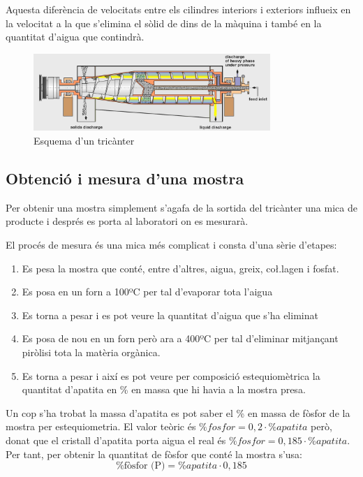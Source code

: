 \documentclass[a4paper]{article}
\begin{document}
Aquesta diferència de velocitats entre els cilindres interiors i exteriors influeix en la velocitat a la que s'elimina el sòlid de dins de la màquina i també en la quantitat d'aigua que contindrà.

\begin{figure}[H]
	\centering
	\includegraphics[width=0.8\textwidth]{images/tricanter}
	\caption{Esquema d'un tricànter}
	\label{fig:tricanter}
\end{figure}

\subsection{Obtenció i mesura d'una mostra}
Per obtenir una mostra simplement s'agafa de la sortida del tricànter una mica de producte i després es porta al laboratori on es mesurarà.

El procés de mesura és una mica més complicat i consta d'una sèrie d'etapes:

\begin{enumerate}
	\item Es pesa la mostra que conté, entre d'altres, aigua, greix, co\l.lagen i fosfat.
	\item Es posa en un forn a 100ºC per tal d'evaporar tota l'aigua 
	\item Es torna a pesar i es pot veure la quantitat d'aigua que s'ha eliminat
	\item Es posa de nou en un forn però ara a 400ºC per tal d'eliminar mitjançant piròlisi tota la matèria orgànica.
	\item Es torna a pesar i així es pot veure per composició estequiomètrica la quantitat d'apatita en \% en massa que hi havia a la mostra presa.
\end{enumerate} 

Un cop s'ha trobat la massa d'apatita es pot saber el \% en massa de fòsfor de la mostra per estequiometria. El valor teòric és $\% fosfor = 0,2 \cdot \% apatita$ però, donat que el cristall d'apatita porta aigua el real és $\% fosfor = 0,185 \cdot \% apatita$. Per tant, per obtenir la quantitat de fòsfor que conté la mostra s'usa:
$$
\boxed{\% \text{fòsfor (P)} = \% apatita \cdot 0,185}
$$
\end{document}
